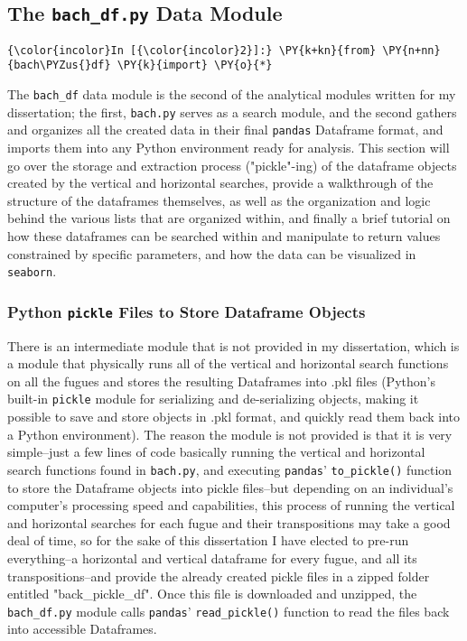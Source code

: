     \subsection{\texorpdfstring{The \texttt{bach\_df.py} Data
Module}{The bach\_df.py Data Module}}\label{the-bach_df.py-data-module}

    \begin{Verbatim}[commandchars=\\\{\}]
{\color{incolor}In [{\color{incolor}2}]:} \PY{k+kn}{from} \PY{n+nn}{bach\PYZus{}df} \PY{k}{import} \PY{o}{*}
\end{Verbatim}

    The \texttt{bach\_df} data module is the second of the analytical
modules written for my dissertation; the first, \texttt{bach.py} serves
as a search module, and the second gathers and organizes all the created
data in their final \texttt{pandas} Dataframe format, and imports them
into any Python environment ready for analysis. This section will go
over the storage and extraction process ("pickle"-ing) of the dataframe
objects created by the vertical and horizontal searches, provide a
walkthrough of the structure of the dataframes themselves, as well as
the organization and logic behind the various lists that are organized
within, and finally a brief tutorial on how these dataframes can be
searched within and manipulate to return values constrained by specific
parameters, and how the data can be visualized in \texttt{seaborn}.

\subsubsection{\texorpdfstring{Python \texttt{pickle} Files to Store
Dataframe
Objects}{Python pickle Files to Store Dataframe Objects}}\label{python-pickle-files-to-store-dataframe-objects}

There is an intermediate module that is not provided in my dissertation,
which is a module that physically runs all of the vertical and
horizontal search functions on all the fugues and stores the resulting
Dataframes into .pkl files (Python's built-in \texttt{pickle} module for
serializing and de-serializing objects, making it possible to save and
store objects in .pkl format, and quickly read them back into a Python
environment). The reason the module is not provided is that it is very
simple--just a few lines of code basically running the vertical and
horizontal search functions found in \texttt{bach.py}, and executing
\texttt{pandas}' \texttt{to\_pickle()} function to store the Dataframe
objects into pickle files--but depending on an individual's computer's
processing speed and capabilities, this process of running the vertical
and horizontal searches for each fugue and their transpositions may take
a good deal of time, so for the sake of this dissertation I have elected
to pre-run everything--a horizontal and vertical dataframe for every
fugue, and all its transpositions--and provide the already created
pickle files in a zipped folder entitled "back\_pickle\_df". Once this
file is downloaded and unzipped, the \texttt{bach\_df.py} module calls
\texttt{pandas}' \texttt{read\_pickle()} function to read the files back
into accessible Dataframes.

